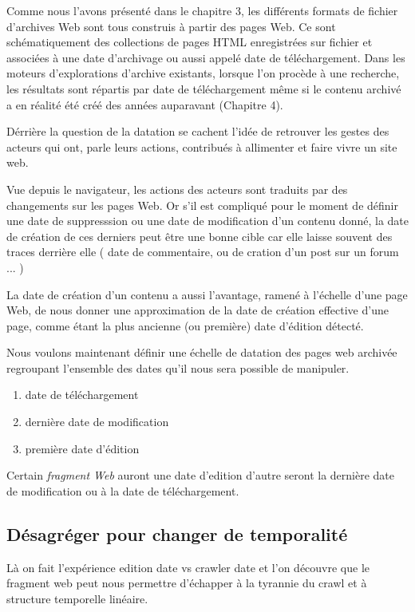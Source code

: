 \documentclass{tufte-book}
\begin{document}
Comme nous l'avons présenté dans le chapitre 3, les différents formats de fichier d'archives Web sont tous construis à partir des pages Web. Ce sont schématiquement des collections de pages HTML enregistrées sur fichier et associées à une date d'archivage ou aussi appelé date de téléchargement. Dans les moteurs d'explorations d'archive existants, lorsque l'on procède à une recherche, les résultats sont répartis par date de téléchargement même si le contenu archivé a en réalité été créé des années auparavant (Chapitre 4).    

Dérrière la question de la datation se cachent l'idée de retrouver les gestes des acteurs qui ont, parle leurs actions, contribués à allimenter et faire vivre un site web. 

Vue depuis le navigateur, les actions des acteurs sont traduits par des changements sur les pages Web. Or s'il est compliqué pour le moment de définir une date de suppresssion ou une date de modification d'un contenu donné, la date de création de ces derniers peut être une bonne cible car elle laisse souvent des traces derrière elle ( date de commentaire, ou de cration d'un post sur un forum ... )

La date de création d'un contenu a aussi l'avantage, ramené à l'échelle d'une page Web, de nous donner une approximation de la date de création effective d'une page, comme étant la plus ancienne (ou première) date d'édition détecté.

Nous voulons maintenant définir une échelle de datation des pages web archivée regroupant l'ensemble des dates qu'il nous sera possible de manipuler. 

\begin{enumerate}
\setlength\itemsep{0em}
\item date de téléchargement
\item dernière date de modification
\item première date d'édition
\end{enumerate} 

Certain \textit{fragment Web} auront une date d'edition d'autre seront la dernière date de modification ou à la date de téléchargement.  

\subsection{Désagréger pour changer de temporalité}

Là on fait l'expérience edition date vs crawler date et l'on découvre que le fragment web peut nous permettre d'échapper à la tyrannie du crawl et à structure temporelle linéaire.
\end{document}
